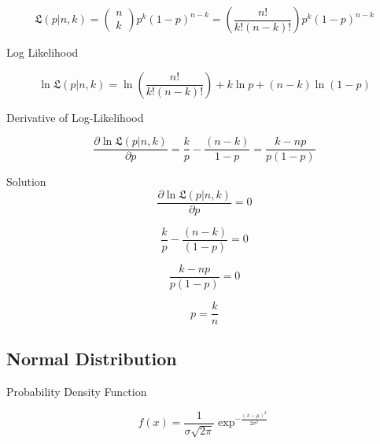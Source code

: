 \documentclass[12pt]{report}
\begin{document}
\begin{equation}
\mathfrak{L}(p|n,k) = \begin{pmatrix}
n\\k
\end{pmatrix} p^k (1-p)^{n-k} =\left( \frac{n!}{k!(n-k)!}\right) p^k (1-p)^{n-k}
\end{equation}

Log Likelihood

\begin{equation}
\ln \mathfrak{L}(p | n, k) = \ln \left( \frac{n!}{k!(n-k)!}\right) + k \ln p  + (n-k) \ln (1-p)
\end{equation}


Derivative of Log-Likelihood

\begin{equation}
\frac{\partial \ln \mathfrak{L}(p | n, k)}{\partial p} = \frac{k}{p} - \frac{(n-k)}{1 - p} = \frac{k - np}{p (1-p)}
\end{equation}


Solution 
\begin{equation}
\frac{\partial \ln \mathfrak{L}(p | n, k)}{\partial p} = 0
\end{equation}

\begin{equation}
\frac{k}{p} - \frac{(n-k)}{(1-p)} = 0
\end{equation}

\begin{equation}
\frac{k - np}{p (1-p)} = 0
\end{equation}

\begin{equation}
p = \frac{k}{n}
\end{equation}


\clearpage
\subsection*{Normal Distribution}


Probability Density Function

\begin{equation}
f(x) = \frac{1}{\sigma \sqrt{2 \pi}} \exp^{-\frac{(x-\mu)^2}{2\sigma^2}}
\end{equation}



\end{document}
